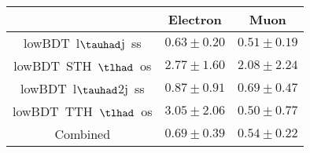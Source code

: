 \centering
\begin{tabular}{|c|c|c|} \hline
 & Electron & Muon\\\hline
lowBDT~l$\tauhad$j~ss & $0.63\pm0.20$ & $0.51\pm0.19$\\\hline
lowBDT~STH~$\tlhad$~os & $2.77\pm1.60$ & $2.08\pm2.24$\\\hline
lowBDT~l$\tauhad$2j~ss & $0.87\pm0.91$ & $0.69\pm0.47$\\\hline
lowBDT~TTH~$\tlhad$~os & $3.05\pm2.06$ & $0.50\pm0.77$\\\hline
Combined & $0.69\pm0.39$ & $0.54\pm0.22$\\\hline
\end{tabular}
